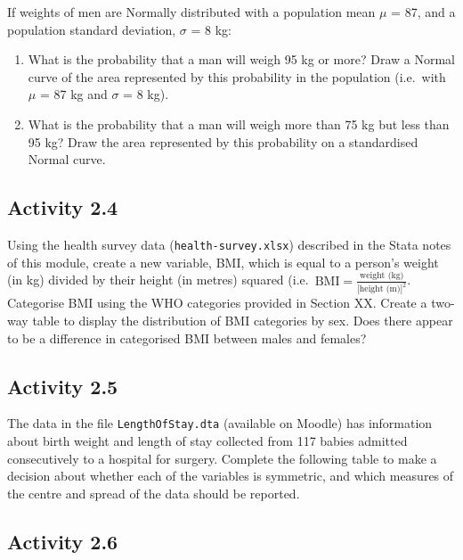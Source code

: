 \documentclass[
]{memoir}
\providecommand{\tightlist}{%
  \setlength{\itemsep}{0pt}\setlength{\parskip}{0pt}}
\begin{document}
If weights of men are Normally distributed with a population mean \(\mu\) = 87, and a population standard deviation, \(\sigma\) = 8 kg:

\begin{enumerate}
\def\labelenumi{\alph{enumi})}
\tightlist
\item
  What is the probability that a man will weigh 95 kg or more? Draw a Normal curve of the area represented by this probability in the population (i.e.~with \(\mu\) = 87 kg and \(\sigma\) = 8 kg).
\item
  What is the probability that a man will weigh more than 75 kg but less than 95 kg? Draw the area represented by this probability on a standardised Normal curve.
\end{enumerate}

\hypertarget{activity-2.4}{%
\subsection*{Activity 2.4}\label{activity-2.4}}

Using the health survey data (\texttt{health-survey.xlsx}) described in the Stata notes of this module, create a new variable, BMI, which is equal to a person's weight (in kg) divided by their height (in metres) squared (i.e.~\(\text{BMI} = \frac{\text{weight (kg)}}{\text{[height (m)]}^2}\). Categorise BMI using the WHO categories provided in Section XX. Create a two-way table to display the distribution of BMI categories by sex. Does there appear to be a difference in categorised BMI between males and females?

\hypertarget{activity-2.5}{%
\subsection*{Activity 2.5}\label{activity-2.5}}

The data in the file \texttt{LengthOfStay.dta} (available on Moodle) has information about birth weight and length of stay collected from 117 babies admitted consecutively to a hospital for surgery. Complete the following table to make a decision about whether each of the variables is symmetric, and which measures of the centre and spread of the data should be reported.

\hypertarget{activity-2.6}{%
\subsection*{Activity 2.6}\label{activity-2.6}}
\end{document}
